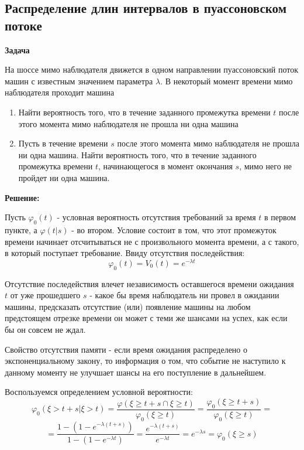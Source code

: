 \documentclass[aps,%
12pt,%
final,%
oneside,
onecolumn,%
musixtex, %
superscriptaddress,%
centertags]{article} %
\theoremstyle{plain}
\theoremstyle{definition}
\theoremstyle{remark}
\begin{document}
\newpage
\subsection{Распределение длин интервалов в пуассоновском потоке}

\textbf{Задача}

На шоссе мимо наблюдателя движется в одном направлении пуассоновский поток машин с известным значением параметра $\lambda$. В некоторый момент времени мимо наблюдателя проходит машина

\begin{enumerate}
	\item Найти вероятность того, что в течение заданного промежутка времени $t$ после этого момента мимо наблюдателя не прошла ни одна машина
	\item Пусть в течение времени $s$ после этого момента мимо наблюдателя не прошла ни одна машина. Найти вероятность того, что в течение заданного промежутка времени $t$, начинающегося в момент окончания $s$, мимо него не пройдет ни одна машина.
\end{enumerate}

\textbf{Решение:}

Пусть $\varphi_0(t)$ - условная вероятность отсутствия требований за время $t$ в первом пункте, а $\varphi(t |s )$ - во втором. Условие состоит в том, что этот промежуток времени начинает отсчитываться не с произвольного момента времени, а с такого, в который поступает требование. Ввиду отсутствия последействия:
$$\varphi_0(t) = V_0(t) = e^{-\lambda t}$$

Отсутствие последействия влечет независимость оставшегося времени ожидания $t$ от уже прошедшего $s$ - какое бы время наблюдатель ни провел в ожидании машины, предсказать отсутствие (или) появление машины на любом предстоящем отрезке времени он может с теми же шансами на успех, как если бы он совсем не ждал. 

Свойство отсутствия памяти - если время ожидания распределено о экспоненциальному закону, то информация о том, что событие не наступило к данному моменту не улучшает шансы на его поступление в дальнейшем.

Воспользуемся определением условной вероятности:
$$\varphi_0(\xi > t + s|\xi >t) = \frac{\varphi(\xi \geq t+s \cap \xi \geq t)}{\varphi_0(\xi \geq t)} = \frac{\varphi_0(\xi \geq t+s)}{\varphi_0(\xi \geq t)} = $$
$$ = \frac{1-(1-e^{-\lambda(t+s)})}{1-(1-e^{-\lambda t})} = \frac{e^{-\lambda(t+s)}}{e^{-\lambda t}} = e^{-\lambda s} = \varphi_0(\xi \geq s)$$
\end{document}
